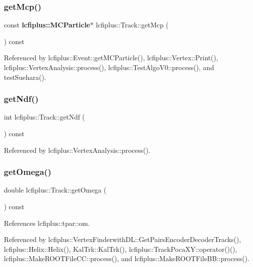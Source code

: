 \subsubsection{get\+Mcp()}
{\footnotesize\ttfamily const \textbf{ lcfiplus\+::\+M\+C\+Particle}$\ast$ lcfiplus\+::\+Track\+::get\+Mcp (\begin{DoxyParamCaption}{ }\end{DoxyParamCaption}) const\hspace{0.3cm}{\ttfamily [inline]}}



Referenced by lcfiplus\+::\+Event\+::get\+M\+C\+Particle(), lcfiplus\+::\+Vertex\+::\+Print(), lcfiplus\+::\+Vertex\+Analysis\+::process(), lcfiplus\+::\+Test\+Algo\+V0\+::process(), and test\+Suehara().

\mbox{\label{classlcfiplus_1_1Track_a8fa0de829167e6155dbea0b4c427e9b8}} 
\subsubsection{get\+Ndf()}
{\footnotesize\ttfamily int lcfiplus\+::\+Track\+::get\+Ndf (\begin{DoxyParamCaption}{ }\end{DoxyParamCaption}) const\hspace{0.3cm}{\ttfamily [inline]}}



Referenced by lcfiplus\+::\+Vertex\+Analysis\+::process().

\mbox{\label{classlcfiplus_1_1Track_a3c518c7e320031757c0a1d0bfb4c599e}} 
\subsubsection{get\+Omega()}
{\footnotesize\ttfamily double lcfiplus\+::\+Track\+::get\+Omega (\begin{DoxyParamCaption}{ }\end{DoxyParamCaption}) const\hspace{0.3cm}{\ttfamily [inline]}}



References lcfiplus\+::tpar\+::om.



Referenced by lcfiplus\+::\+Vertex\+Finderwith\+D\+L\+::\+Get\+Pairs\+Encoder\+Decoder\+Tracks(), lcfiplus\+::\+Helix\+::\+Helix(), Kal\+Trk\+::\+Kal\+Trk(), lcfiplus\+::\+Track\+Poca\+X\+Y\+::operator()(), lcfiplus\+::\+Make\+R\+O\+O\+T\+File\+C\+C\+::process(), and lcfiplus\+::\+Make\+R\+O\+O\+T\+File\+B\+B\+::process().

